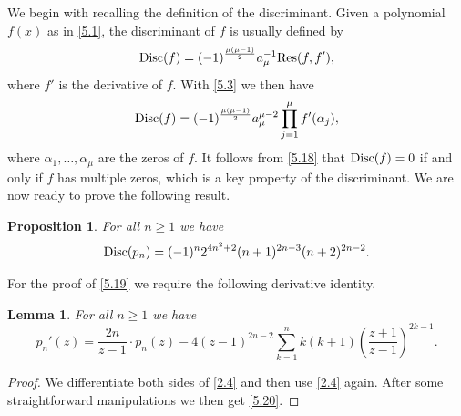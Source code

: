\documentclass{amsart}
\theoremstyle{plain}
\newtheorem{proposition}[theorem]{Proposition}
\newtheorem{lemma}[theorem]{Lemma}
\numberwithin{equation}{section}
\begin{document}
We begin with recalling the definition of the discriminant. Given a polynomial
$f(x)$ as in \eqref{5.1}, the discriminant of $f$ is usually defined by
\begin{equation}\label{5.17}
{\rm Disc}(f)=(-1)^{\frac{\mu(\mu-1)}{2}}a_{\mu}^{-1}{\rm Res}(f,f'),
\end{equation}
where $f'$ is the derivative of $f$. With \eqref{5.3} we then have
\begin{equation}\label{5.18}
{\rm Disc}(f)=(-1)^{\frac{\mu(\mu-1)}{2}}a_{\mu}^{\mu-2}
\prod_{j=1}^{\mu}f'(\alpha_j),
\end{equation}
where $\alpha_1, \ldots, \alpha_{\mu}$ are the zeros of $f$. It follows from
\eqref{5.18} that ${\rm Disc}(f)=0$ if and only if $f$ has multiple zeros, 
which is a key property of the discriminant. We are now ready to prove the
following result.

\begin{proposition}\label{prop:5.4}
For all $n\geq 1$ we have
\begin{equation}\label{5.19}
{\rm Disc}(p_n) = (-1)^n 2^{4n^2+2}(n+1)^{2n-3}(n+2)^{2n-2}.
\end{equation}
\end{proposition}

For the proof of \eqref{5.19} we require the following derivative identity.

\begin{lemma}\label{lem:5.5}
For all $n\geq 1$ we have
\begin{equation}\label{5.20}
p_n'(z) = \frac{2n}{z-1}\cdot p_n(z)-4(z-1)^{2n-2}
\sum_{k=1}^n k(k+1)\left(\frac{z+1}{z-1}\right)^{2k-1}.
\end{equation}
\end{lemma}

\begin{proof}
We differentiate both sides of \eqref{2.4} and then use \eqref{2.4} again. After
some straightforward manipulations we then get \eqref{5.20}.
\end{proof}
\end{document}
